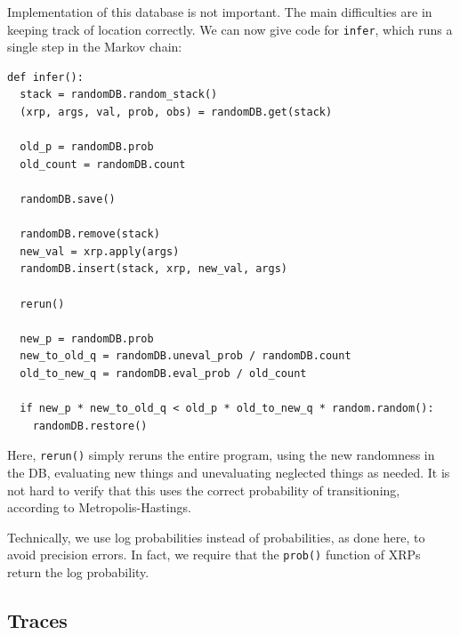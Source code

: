 \documentclass[11pt]{article}
\begin{document}
Implementation of this database is not important.  The main difficulties are in keeping track of location correctly.  %
We can now give code for {\tt infer}, which runs a single step in the Markov chain:

\begin{small}
\begin{verbatim}
def infer():
  stack = randomDB.random_stack()
  (xrp, args, val, prob, obs) = randomDB.get(stack)

  old_p = randomDB.prob
  old_count = randomDB.count

  randomDB.save()

  randomDB.remove(stack)
  new_val = xrp.apply(args)
  randomDB.insert(stack, xrp, new_val, args)

  rerun()
  
  new_p = randomDB.prob
  new_to_old_q = randomDB.uneval_prob / randomDB.count
  old_to_new_q = randomDB.eval_prob / old_count
  
  if new_p * new_to_old_q < old_p * old_to_new_q * random.random():
    randomDB.restore()
\end{verbatim}
\end{small}


\noindent Here, {\tt rerun()} simply reruns the entire program, using the new randomness in the DB, evaluating new things and unevaluating neglected things as needed.  It is not hard to verify that this uses the correct probability of transitioning, according to Metropolis-Hastings.  

Technically, we use log probabilities instead of probabilities, as done here, to avoid precision errors.  In fact, we require that the {\tt prob()} function of XRPs return the log probability.







\subsection{Traces}
\end{document}
